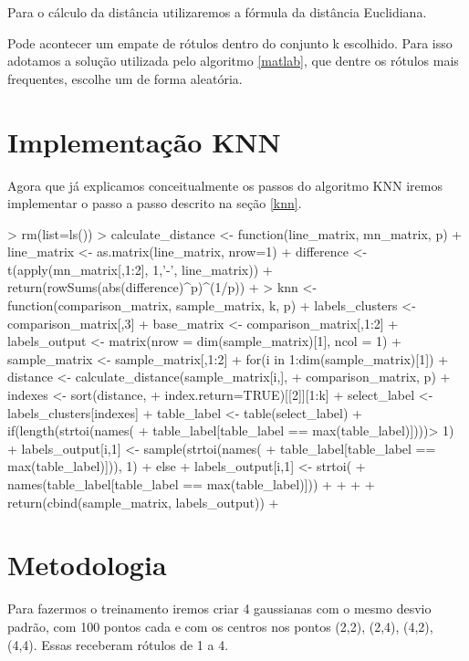 \documentclass[12pt]{article}
\begin{document}
  \par Para o cálculo da distância utilizaremos a fórmula da distância Euclidiana. 
  
  \par Pode acontecer um empate de rótulos dentro do conjunto k escolhido. Para isso adotamos a solução utilizada pelo algoritmo \ref{matlab}, que dentre os rótulos mais frequentes, escolhe um de forma aleatória. 

\section{Implementação KNN}

  \par Agora que já explicamos  conceitualmente os passos do algoritmo KNN iremos implementar o passo a passo descrito na seção \ref{knn}.
  
\begin{Schunk}
\begin{Sinput}
> rm(list=ls())
> calculate_distance <- function(line_matrix, mn_matrix, p){
+   line_matrix <- as.matrix(line_matrix, nrow=1)
+   difference <- t(apply(mn_matrix[,1:2], 1,'-', line_matrix))
+   return(rowSums(abs(difference)^p)^(1/p))
+ }
> knn <- function(comparison_matrix, sample_matrix, k, p){
+     labels_clusters <- comparison_matrix[,3]
+     base_matrix <-  comparison_matrix[,1:2]
+     labels_output <- matrix(nrow = dim(sample_matrix)[1], ncol = 1)
+     sample_matrix <- sample_matrix[,1:2]
+     for(i in 1:dim(sample_matrix)[1]){
+       distance <- calculate_distance(sample_matrix[i,],
+                                      comparison_matrix, p)
+       indexes <- sort(distance,
+                       index.return=TRUE)[[2]][1:k]
+       select_label <- labels_clusters[indexes]
+       table_label <- table(select_label)
+       if(length(strtoi(names(
+         table_label[table_label == max(table_label)])))> 1){
+          labels_output[i,1] <- sample(strtoi(names(
+            table_label[table_label == max(table_label)])), 1)
+       }else{
+         labels_output[i,1] <- strtoi(
+           names(table_label[table_label == max(table_label)]))
+       }
+       
+     }
+     return(cbind(sample_matrix, labels_output))
+ }
\end{Sinput}
\end{Schunk}

\section{Metodologia}
  \par Para fazermos o treinamento iremos  criar 4 gaussianas com o mesmo desvio padrão, com 100 pontos cada e com os centros nos pontos (2,2), (2,4), (4,2), (4,4). Essas receberam rótulos de 1 a 4. 
  
\end{document}

